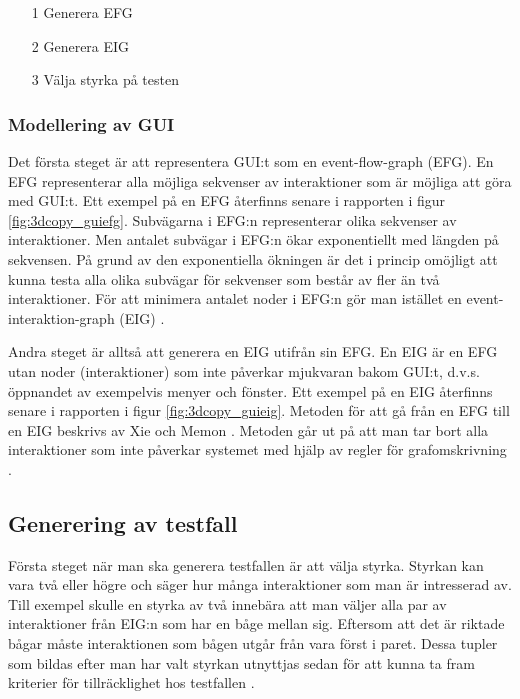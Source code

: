 \begin{itemize}
	\item [1] Generera EFG
	\item [2] Generera EIG
	\item [3] Välja styrka på testen
\end{itemize}

\subsubsection{Modellering av GUI}

Det första steget är att representera GUI:t som en event-flow-graph (EFG). En EFG representerar alla möjliga sekvenser av interaktioner som är möjliga att göra med GUI:t. Ett exempel på en EFG återfinns senare i rapporten i figur \ref{fig:3dcopy_guiefg}. Subvägarna i EFG:n representerar olika sekvenser av interaktioner. Men antalet subvägar i EFG:n ökar exponentiellt med längden på sekvensen. På grund av den exponentiella ökningen är det i princip omöjligt att kunna testa alla olika subvägar för sekvenser som består av fler än två interaktioner. För att minimera antalet noder i EFG:n gör man istället en event-interaktion-graph (EIG) \cite{yuan2011gui}. 

Andra steget är alltså att generera en EIG utifrån sin EFG. En EIG är en EFG utan noder (interaktioner) som inte påverkar mjukvaran bakom GUI:t, d.v.s. öppnandet av exempelvis menyer och fönster. Ett exempel på en EIG återfinns senare i rapporten i figur \ref{fig:3dcopy_guieig}. Metoden för att gå från en EFG till en EIG beskrivs av Xie och Memon \cite{xie2008using}. Metoden går ut på att man tar bort alla interaktioner som inte påverkar systemet med hjälp av regler för grafomskrivning \cite{yuan2011gui}. 

\subsection{Generering av testfall}

Första steget när man ska generera testfallen är att välja styrka. Styrkan kan vara två eller högre och säger hur många interaktioner som man är intresserad av. Till exempel skulle en styrka av två innebära att man väljer alla par av interaktioner från EIG:n som har en båge mellan sig. Eftersom att det är riktade bågar måste interaktionen som bågen utgår från vara först i paret. Dessa tupler som bildas efter man har valt styrkan utnyttjas sedan för att kunna ta fram kriterier för tillräcklighet hos testfallen \cite{yuan2011gui}. 

